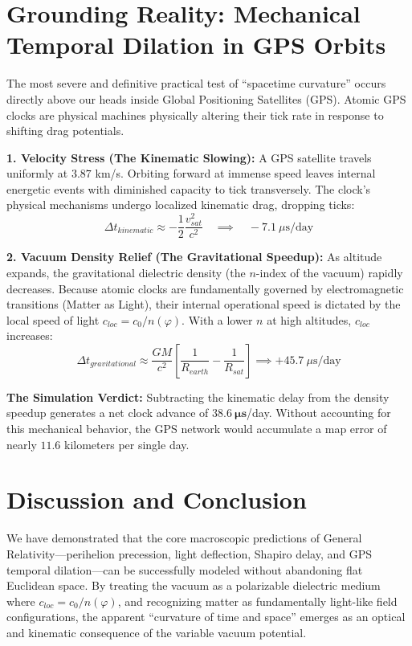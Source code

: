 \documentclass[reprint,amsmath,amssymb,aps,prd,twocolumn]{revtex4-2}
\begin{document}
\section{Grounding Reality: Mechanical Temporal Dilation in GPS Orbits}

The most severe and definitive practical test of ``spacetime curvature'' occurs directly above our heads inside Global Positioning Satellites (GPS). Atomic GPS clocks are physical machines physically altering their tick rate in response to shifting drag potentials.

\textbf{1. Velocity Stress (The Kinematic Slowing):} 
A GPS satellite travels uniformly at $3.87$ km/s. Orbiting forward at immense speed leaves internal energetic events with diminished capacity to tick transversely. The clock's physical mechanisms undergo localized kinematic drag, dropping ticks:
\begin{equation}
\Delta t_{kinematic} \approx -\frac{1}{2} \frac{v_{sat}^2}{c^2} \quad \implies \quad -7.1\ \mu\text{s/day}
\end{equation}

\textbf{2. Vacuum Density Relief (The Gravitational Speedup):} 
As altitude expands, the gravitational dielectric density (the $n$-index of the vacuum) rapidly decreases. Because atomic clocks are fundamentally governed by electromagnetic transitions (Matter as Light), their internal operational speed is dictated by the local speed of light $c_{loc} = c_0 / n(\varphi)$. With a lower $n$ at high altitudes, $c_{loc}$ increases:
\begin{equation}
\Delta t_{gravitational} \approx \frac{GM}{c^2} \left[ \frac{1}{R_{earth}} - \frac{1}{R_{sat}} \right] \implies +45.7\ \mu\text{s/day}
\end{equation}

\textbf{The Simulation Verdict:}
Subtracting the kinematic delay from the density speedup generates a net clock advance of $\mathbf{38.6\ \mu s}$/day. Without accounting for this mechanical behavior, the GPS network would accumulate a map error of nearly $11.6$ kilometers per single day.

\section{Discussion and Conclusion}

We have demonstrated that the core macroscopic predictions of General Relativity---perihelion precession, light deflection, Shapiro delay, and GPS temporal dilation---can be successfully modeled without abandoning flat Euclidean space. By treating the vacuum as a polarizable dielectric medium where $c_{loc} = c_0 / n(\varphi)$, and recognizing matter as fundamentally light-like field configurations, the apparent ``curvature of time and space'' emerges as an optical and kinematic consequence of the variable vacuum potential.
\end{document}
